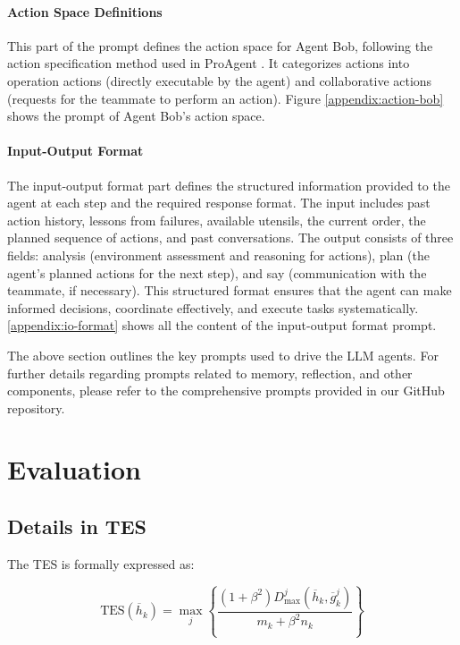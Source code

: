 \documentclass[11pt]{article}
\begin{document}
\paragraph{Action Space Definitions}

This part of the prompt defines the action space for Agent Bob, following the action specification method used in ProAgent \cite{zhang2024proagent}. It categorizes actions into operation actions (directly executable by the agent) and collaborative actions (requests for the teammate to perform an action). Figure \ref{appendix:action-bob} shows the prompt of Agent Bob's action space.

\paragraph{Input-Output Format}

The input-output format part defines the structured information provided to the agent at each step and the required response format. The input includes past action history, lessons from failures, available utensils, the current order, the planned sequence of actions, and past conversations. The output consists of three fields: analysis (environment assessment and reasoning for actions), plan (the agent’s planned actions for the next step), and say (communication with the teammate, if necessary). This structured format ensures that the agent can make informed decisions, coordinate effectively, and execute tasks systematically. \ref{appendix:io-format} shows all the content of the input-output format prompt.

The above section outlines the key prompts used to drive the LLM agents. For further details regarding prompts related to memory, reflection, and other components, please refer to the comprehensive prompts provided in our GitHub repository.

\section{Evaluation}


\subsection{Details in TES}

\label{ap-sea}

The TES is formally expressed as:  

\begin{equation}
\text{TES}(\overline{h}_k) = \max_j\left\{\frac{(1+\beta^2)D_{\text{max}}^j(\overline{h}_k, \overline{g}_k^j)}{m_k + \beta^2 n_k}\right\}
\end{equation}
\end{document}
